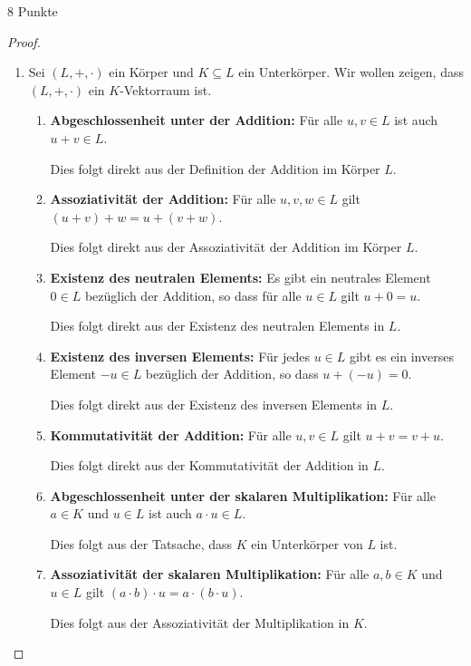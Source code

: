 \documentclass{../problemset}
\begin{document}
\begin{problem}{8 Punkte}
\begin{proof}
	\begin{enumerate}
		\item Sei $(L, +, \cdot)$ ein Körper und $K \subseteq L$ ein Unterkörper. Wir wollen zeigen, dass $(L, +, \cdot)$ ein $K$-Vektorraum ist.

		      \begin{enumerate}
			      \item \textbf{Abgeschlossenheit unter der Addition:} Für alle $u, v \in L$ ist auch $u + v \in L$.

			            Dies folgt direkt aus der Definition der Addition im Körper $L$.

			      \item \textbf{Assoziativität der Addition:} Für alle $u, v, w \in L$ gilt $(u + v) + w = u + (v + w)$.

			            Dies folgt direkt aus der Assoziativität der Addition im Körper $L$.

			      \item \textbf{Existenz des neutralen Elements:} Es gibt ein neutrales Element $0 \in L$ bezüglich der Addition, so dass für alle $u \in L$ gilt $u + 0 = u$.

			            Dies folgt direkt aus der Existenz des neutralen Elements in $L$.

			      \item \textbf{Existenz des inversen Elements:} Für jedes $u \in L$ gibt es ein inverses Element $-u \in L$ bezüglich der Addition, so dass $u + (-u) = 0$.

			            Dies folgt direkt aus der Existenz des inversen Elements in $L$.

			      \item \textbf{Kommutativität der Addition:} Für alle $u, v \in L$ gilt $u + v = v + u$.

			            Dies folgt direkt aus der Kommutativität der Addition in $L$.

			      \item \textbf{Abgeschlossenheit unter der skalaren Multiplikation:} Für alle $a \in K$ und $u \in L$ ist auch $a \cdot u \in L$.

			            Dies folgt aus der Tatsache, dass $K$ ein Unterkörper von $L$ ist.

			      \item \textbf{Assoziativität der skalaren Multiplikation:} Für alle $a, b \in K$ und $u \in L$ gilt $(a \cdot b) \cdot u = a \cdot (b \cdot u)$.

			            Dies folgt aus der Assoziativität der Multiplikation in $K$.


\end{enumerate}
\end{enumerate}
\end{proof}
\end{problem}
\end{document}
